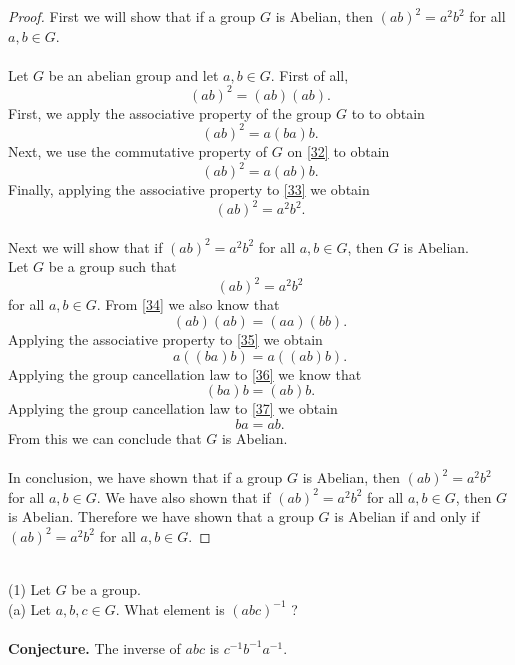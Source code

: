 \documentclass[11pt,a4paper]{article}
\begin{document}
\begin{proof}
First we will show that if a group $G$ is Abelian, then $(ab)^2 = a^2 b^2$ for all $a, b \in G$.\\
~\\
Let $G$ be an abelian group and let $a,b\in G$. First of all,
\begin{equation}\label{31}
(ab)^2 = (ab)(ab).
\end{equation}
First, we apply the associative property of the group $G$ to \label{31} to obtain
\begin{equation}\label{32}
(ab)^2 = a(ba)b.
\end{equation}
Next, we use the commutative property of $G$ on \eqref{32} to obtain
\begin{equation}\label{33}
(ab)^2 = a(ab)b.
\end{equation}
Finally, applying the associative property to \eqref{33} we obtain
\[(ab)^2 = a^2b^2.\]
~\\
Next we will show that if $(ab)^2 = a^2b^2$ for all $a,b\in G$, then $G$ is Abelian.
~\\
Let $G$ be a group such that
\begin{equation}\label{34}
(ab)^2 = a^2b^2
\end{equation}
for all $a,b \in G$. From \eqref{34} we also know that
\begin{equation}\label{35}
(ab)(ab) = (aa)(bb).
\end{equation}
Applying the associative property to \eqref{35} we obtain
\begin{equation}\label{36}
a((ba)b) = a((ab)b).
\end{equation}
Applying the group cancellation law to \eqref{36} we know that
\begin{equation}\label{37}
(ba)b = (ab)b.
\end{equation}
Applying the group cancellation law to \eqref{37} we obtain
\[ba = ab.\]
From this we can conclude that $G$ is Abelian.\\
~\\
In conclusion, we have shown that if a group $G$ is Abelian, then $(ab)^2 = a^2 b^2$ for all $a, b \in G$. We have also shown that if $(ab)^2 = a^2b^2$ for all $a,b\in G$, then $G$ is Abelian. Therefore we have shown that a group $G$ is Abelian if and only if $(ab)^2 = a^2 b^2$ for all $a, b \in G$.
\end{proof}
~\\
(1) Let $G$ be a group.\\
(a) Let $a, b, c \in G$. What element is $(abc)^{-1}$ ?\\
~\\
{\bf Conjecture.} The inverse of $abc$ is $c^{-1}b^{-1}a^{-1}$.
\end{document}
